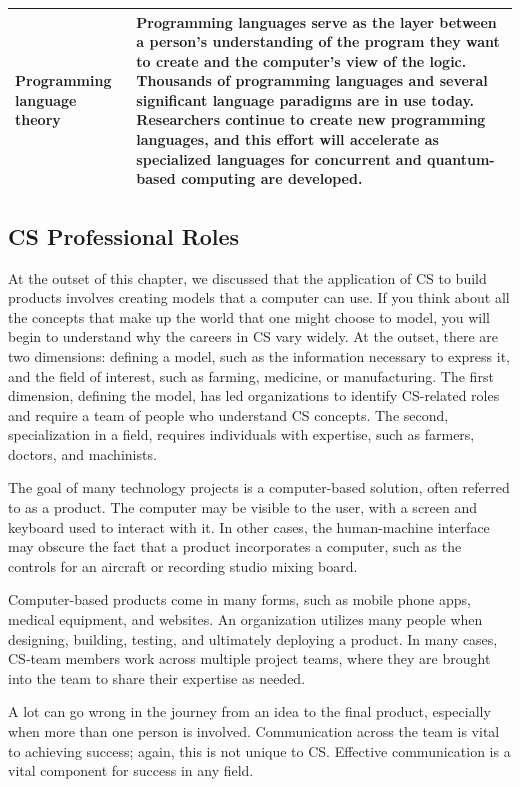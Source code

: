 \begin{longtable}[H]{p{.8in}|p{3.6in}}
	\hline
	\Tstrut Programming language theory & Programming languages serve as the layer between a person's understanding of the program they want to create and the computer's view of the logic. Thousands of programming languages and several significant language paradigms are in use today. Researchers continue to create new programming languages, and this effort will accelerate as specialized languages for concurrent and quantum-based computing are developed.\\
	\bottomrule
\end{longtable}


\subsection{CS Professional Roles}

At the outset of this chapter, we discussed that the application of CS to build products involves creating models that a computer can use. If you think about all the concepts that make up the world that one might choose to model, you will begin to understand why the careers in CS vary widely. At the outset, there are two dimensions: defining a model, such as the information necessary to express it, and the field of interest, such as farming, medicine, or manufacturing. The first dimension, defining the model, has led organizations to identify CS-related roles and require a team of people who understand CS concepts. The second, specialization in a field, requires individuals with expertise, such as farmers, doctors, and machinists.

The goal of many technology projects is a computer-based solution, often referred to as a product. The computer may be visible to the user, with a screen and keyboard used to interact with it. In other cases, the human-machine interface may obscure the fact that a product incorporates a computer, such as the controls for an aircraft or recording studio mixing board.

Computer-based products come in many forms, such as mobile phone apps, medical equipment, and websites. An organization utilizes many people when designing, building, testing, and ultimately deploying a product. In many cases, CS-team members work across multiple project teams, where they are brought into the team to share their expertise as needed. 

A lot can go wrong in the journey from an idea to the final product, especially when more than one person is involved. Communication across the team is vital to achieving success; again, this is not unique to CS. Effective communication is a vital component for success in any field.


